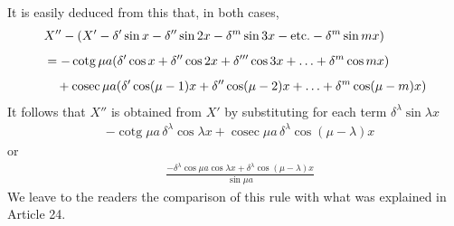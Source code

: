 It is easily deduced from this that, in both cases,
\[
\begin{aligned}
&X''-(X'-\delta'\sin x-\delta''\sin2x-\delta^m\sin3x-\text{etc.}-\delta^m\sin mx)\\[5pt]
&=-\operatorname{cotg}\mu a(\delta'\cos x+\delta''\cos2x+\delta'''\cos3x+\mathinner{.\,.\,.}+\delta^m\cos mx)\\[5pt]
&\quad+\operatorname{cosec}\mu a(\delta'\cos(\mu-1)x+\delta''\cos(\mu-2)x+\mathinner{.\,.\,.}+\delta^m\cos(\mu-m)x)
\end{aligned}
\]
It follows that $X''$ is obtained from $X'$ by substituting for each term $\delta^\lambda\sin\lambda x$
\[
\begin{aligned}
&-\operatorname{cotg}\mu a\,\delta^\lambda\cos\lambda x+\operatorname{cosec}\mu a\,\delta^\lambda\cos(\mu-\lambda)x
\end{aligned}
\]
or
\[
\begin{aligned}
&\frac{-\delta^\lambda\cos\mu a\cos\lambda x+\delta^\lambda\cos(\mu-\lambda)x}{\sin\mu a}
\end{aligned}
\]
We leave to the readers the comparison of this rule with what was explained in Article 24.

